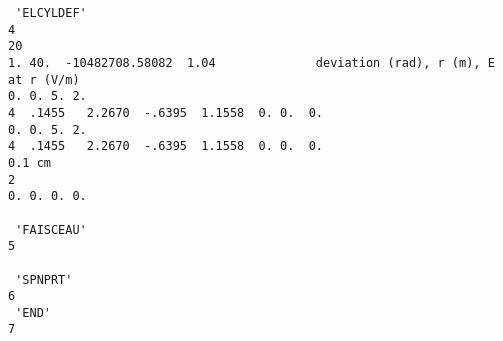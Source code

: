 \documentclass[10pt]{article}
\begin{document}
{\begin{verbatim}
 'ELCYLDEF'                                                                                                   4
20                                                                                                            
1. 40.  -10482708.58082  1.04              deviation (rad), r (m), E at r (V/m)                               
0. 0. 5. 2.                                                                                                   
4  .1455   2.2670  -.6395  1.1558  0. 0.  0.                                                                  
0. 0. 5. 2.                                                                                                   
4  .1455   2.2670  -.6395  1.1558  0. 0.  0.                                                                  
0.1 cm                                                                                                        
2                                                                                                             
0. 0. 0. 0.                                                                                                   
                                                                                                              
 'FAISCEAU'                                                                                                   5
                                                                                                              
 'SPNPRT'                                                                                                     6
 'END'                                                                                                        7
\end{verbatim}
}
\end{document}
